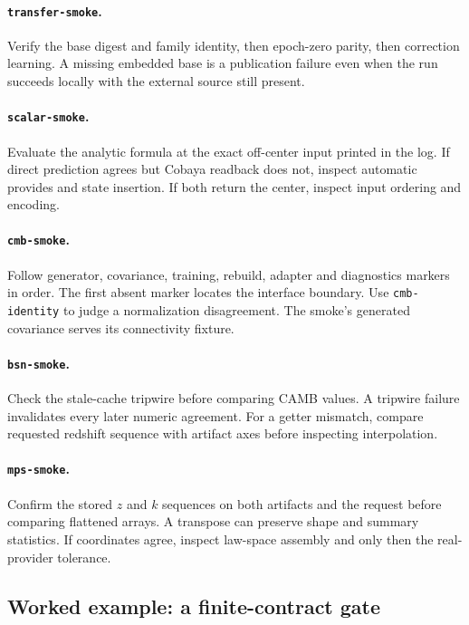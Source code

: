 \documentclass[10pt,aps,prd,twocolumn,nofootinbib]{revtex4-2}
\newcommand{\code}[1]{\texttt{#1}}
\begin{document}
\paragraph{\code{transfer-smoke}.}
Verify the base digest and family identity, then epoch-zero parity, then
correction learning.  A missing embedded base is a publication failure even
when the run succeeds locally with the external source still present.

\paragraph{\code{scalar-smoke}.}
Evaluate the analytic formula at the exact off-center input printed in the
log.  If direct prediction agrees but Cobaya readback does not, inspect
automatic provides and state insertion.  If both return the center, inspect
input ordering and encoding.

\paragraph{\code{cmb-smoke}.}
Follow generator, covariance, training, rebuild, adapter and diagnostics
markers in order.  The first absent marker locates the interface boundary.
Use \code{cmb-identity} to judge a normalization disagreement.  The smoke's
generated covariance serves its connectivity fixture.

\paragraph{\code{bsn-smoke}.}
Check the stale-cache tripwire before comparing CAMB values.  A tripwire
failure invalidates every later numeric agreement.  For a getter mismatch,
compare requested redshift sequence with artifact axes before inspecting
interpolation.

\paragraph{\code{mps-smoke}.}
Confirm the stored \(z\) and \(k\) sequences on both artifacts and the request
before comparing flattened arrays.  A transpose can preserve shape and
summary statistics.  If coordinates agree, inspect law-space assembly and
only then the real-provider tolerance.

\subsection{Worked example: a finite-contract gate}
\end{document}
